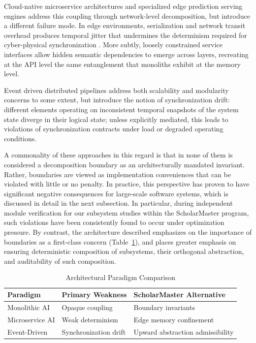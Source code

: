 \documentclass[conference]{IEEEtran}
\begin{document}
Cloud-native microservice architectures \cite{b4, b14} and specialized edge prediction serving engines \cite{b22, b25} address this coupling through network-level decomposition, but introduce a different failure mode. In edge environments, serialization and network transit overhead produces temporal jitter that undermines the determinism required for cyber-physical synchronization \cite{b19}. More subtly, loosely constrained service interfaces allow hidden semantic dependencies to emerge across layers, recreating at the API level the same entanglement that monoliths exhibit at the memory level.

Event driven distributed pipelines \cite{b8} address both scalability and modularity concerns to some extent, but introduce the notion of synchronization drift: different elements operating on inconsistent temporal snapshots of the system state diverge in their logical state; unless explicitly mediated, this leads to violations of synchronization contracts under load or degraded operating conditions.

A commonality of these approaches in this regard is that in none of them is considered a decomposition boundary as an architecturally mandated invariant. Rather, boundaries are viewed as implementation conveniences that can be violated with little or no penalty. In practice, this perspective has proven to have significant negative consequences for large-scale software systems, which is discussed in detail in the next subsection. In particular, during independent module verification for our subsystem studies within the ScholarMaster program, such violations have been consistently found to occur under optimization pressure. By contrast, the architecture described emphasizes on the importance of boundaries as a first-class concern (Table~\ref{tab:related_work}), and places greater emphasis on ensuring deterministic composition of subsystems, their orthogonal abstraction, and auditability of such composition.

\begin{table}[htbp]
\caption{Architectural Paradigm Comparison}
\label{tab:related_work}
\centering
\begin{tabular}{@{}p{2.3cm} p{2.5cm} p{3.0cm}@{}}
\toprule
\textbf{Paradigm} & \textbf{Primary Weakness} & \textbf{ScholarMaster Alternative} \\
\midrule
Monolithic AI & Opaque coupling & Boundary invariants \\
\addlinespace
Microservice AI & Weak determinism & Edge memory confinement \\
\addlinespace
Event-Driven & Synchronization drift & Upward abstraction admissibility \\
\bottomrule
\end{tabular}
\end{table}
\end{document}
